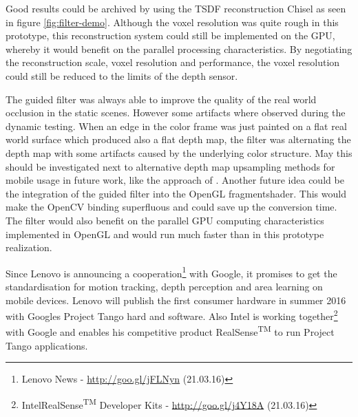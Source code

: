 \documentclass[12pt]{support/thcolognereport}
\begin{document}
Good results could be archived by using the TSDF reconstruction Chisel as seen in figure \ref{fig:filter-demo}. Although the voxel resolution was quite rough in this prototype, this reconstruction system could still be implemented on the GPU, whereby it would benefit on the parallel processing characteristics. By negotiating the reconstruction scale, voxel resolution and performance, the voxel resolution could still be reduced to the limits of the depth sensor.

The guided filter was always able to improve the quality of the real world occlusion in the static scenes. However some artifacts where observed during the dynamic testing. When an edge in the color frame was just painted on a flat real world surface which produced also a flat depth map, the filter was alternating the depth map with some artifacts caused by the underlying color structure. May this should be investigated next to alternative depth map upsampling methods for mobile usage in future work, like the approach of \citet{Ferstl_2013_ICCV}. Another future idea could be the integration of the guided filter into the OpenGL fragmentshader. This would make the OpenCV binding superfluous and could save up the conversion time. The filter would also benefit on the parallel GPU computing characteristics implemented in OpenGL and would run much faster than in this prototype realization. 

Since Lenovo is announcing a cooperation\footnote{Lenovo News - \url{http://goo.gl/jFLNyn} (21.03.16)} with Google, it promises to get the standardisation for motion tracking, depth perception and area learning on mobile devices. Lenovo will publish the first consumer hardware in summer 2016 with Googles Project Tango hard and software. Also Intel is working together\footnote{Intel\textregistered RealSense\textsuperscript{TM} Developer Kits - \url{http://goo.gl/j4Y18A} (21.03.16)} with Google and enables his competitive product RealSense\textsuperscript{TM} to run Project Tango applications.

\setlength{\parskip}{0em}



 
\end{document}
